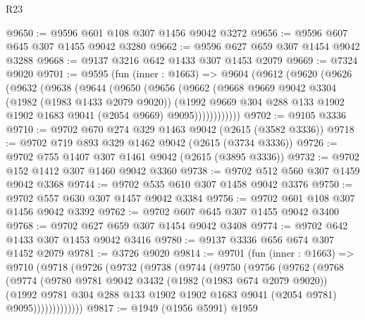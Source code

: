 \begin{lexlean}{R23}
\begin{coremodule}
@9650 := @9596 @601 @108 @307 @1456 @9042 @3272
@9656 := @9596 @607 @645 @307 @1455 @9042 @3280
@9662 := @9596 @627 @659 @307 @1454 @9042 @3288
@9668 := @9137 @3216 @642 @1433 @307 @1453 @2079
@9669 := @7324 @9020
@9701 := @9595
    (fun (inner : @1663) =>
    @9604
      (@9612
        (@9620
          (@9626
            (@9632
              (@9638
                (@9644
                  (@9650
                    (@9656
                      (@9662
                        (@9668
                          @9669
                          @9042
                          @3304
                          (@1982 (@1983 @1433 @2079 @9020))
                          (@1992
                            @9669
                            @304
                            @288
                            @133
                            @1902
                            @1902
                            @1683
                            @9041
                            (@2054 @9669)
                            @9095))))))))))))
@9702 := @9105 @3336
@9710 := @9702 @670 @274 @329 @1463 @9042 (@2615 (@3582 @3336))
@9718 := @9702 @719 @893 @329 @1462 @9042 (@2615 (@3734 @3336))
@9726 := @9702 @755 @1407 @307 @1461 @9042 (@2615 (@3895 @3336))
@9732 := @9702 @152 @1412 @307 @1460 @9042 @3360
@9738 := @9702 @512 @560 @307 @1459 @9042 @3368
@9744 := @9702 @535 @610 @307 @1458 @9042 @3376
@9750 := @9702 @557 @630 @307 @1457 @9042 @3384
@9756 := @9702 @601 @108 @307 @1456 @9042 @3392
@9762 := @9702 @607 @645 @307 @1455 @9042 @3400
@9768 := @9702 @627 @659 @307 @1454 @9042 @3408
@9774 := @9702 @642 @1433 @307 @1453 @9042 @3416
@9780 := @9137 @3336 @656 @674 @307 @1452 @2079
@9781 := @3726 @9020
@9814 := @9701
    (fun (inner : @1663) =>
    @9710
      (@9718
        (@9726
          (@9732
            (@9738
              (@9744
                (@9750
                  (@9756
                    (@9762
                      (@9768
                        (@9774
                          (@9780
                            @9781
                            @9042
                            @3432
                            (@1982 (@1983 @674 @2079 @9020))
                            (@1992
                              @9781
                              @304
                              @288
                              @133
                              @1902
                              @1902
                              @1683
                              @9041
                              (@2054 @9781)
                              @9095)))))))))))))
@9817 := @1949 (@1956 @5991) @1959

\end{coremodule}
\end{lexlean}

